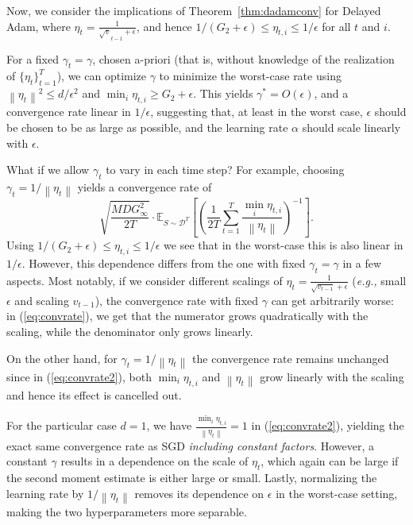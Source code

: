 \documentclass{article}
\newcommand{\eg}{\textit{e.g.,} }
\newcommand{\norm}[1]{\left\lVert{#1}\right\rVert}
\newcommand{\thmref}[1]{Theorem~\ref{#1}}
\renewcommand{\eqref}[1]{(\ref{#1})}
\newcommand{\prevv}{v_{t-1}}
\newcommand{\curre}{\eta_t}
\newcommand{\currei}{\eta_{t,i}}
\newcommand{\fdist}{D}
\newcommand{\smooth}{M}
\newcommand{\gradb}{G_\infty}
\newcommand{\gradbtwo}{G_2}
\newcommand{\expec}[2]{\mathbb E_{#1} \left[ {#2} \right]}
\newcommand{\dist}{\mathcal D}
\begin{document}
Now, we consider the implications of \thmref{thm:dadamconv} for Delayed Adam,
where $\curre = \frac{1}{\sqrt \prevv + \epsilon}$, and hence
$1 / (\gradbtwo + \epsilon) \leq \currei \leq 1 / \epsilon$
for all $t$ and $i$.

For a fixed $\gamma_t = \gamma$, chosen a-priori (that is, without knowledge of
the realization of $\{\curre\}_{t=1}^T$), we can optimize $\gamma$ to minimize
the worst-case rate using $\norm{\curre}^2 \leq d/\epsilon^2$ and
$\min_i \currei \geq \gradbtwo + \epsilon$.  This yields
$\gamma^* = O(\epsilon)$, and a convergence rate linear in $1 / \epsilon$,
suggesting that, at least in the worst case, $\epsilon$ should be chosen to be
as large as possible, and the learning rate $\alpha$ should scale linearly with
$\epsilon$.

What if we allow $\gamma_t$ to vary in each time step?  For example, choosing
$\gamma_t = 1 / \norm{\curre}$ yields a convergence rate of
\begin{equation}
  \sqrt{\frac{\smooth \fdist \gradb^2}{2T}} \cdot
            \expec{S \sim \dist^T}{\left(\frac{1}{2T} \sum_{t=1}^T \frac{\min_i \currei}{\norm{\curre}}\right)^{-1}}.
\label{eq:convrate2}
\end{equation}
Using $1 / (\gradbtwo + \epsilon) \leq \currei \leq 1 / \epsilon$ we see
that in the worst-case this is also linear in $1/ \epsilon$. However, this dependence differs
from the one with fixed $\gamma_t = \gamma$ in a few aspects.  Most notably, if
we consider different scalings of $\curre = \frac{1}{\sqrt {\prevv} + \epsilon}$
(\eg small $\epsilon$ and scaling $\prevv$), the convergence rate with fixed
$\gamma$ can get arbitrarily worse: in \eqref{eq:convrate}, we get that the numerator grows quadratically with the scaling, while the denominator only grows linearly.

On the other hand, for
$\gamma_t = 1 / \norm{\curre}$ the convergence rate remains unchanged since in \eqref{eq:convrate2}, both $\min_i \currei$ and $\norm{\curre}$ grow linearly with the scaling and hence its effect is cancelled out.

For the particular case $d=1$, we have
$\frac{\min_i \currei}{\norm{\curre}} = 1$ in \eqref{eq:convrate2}, yielding the exact same convergence rate as SGD \emph{including constant factors}. However, a constant
$\gamma$ results in a dependence on the scale of $\curre$, which
again can be large if the second moment estimate is either large or small.  Lastly, normalizing
the learning rate by $1 / \norm{\curre}$ removes its dependence on
$\epsilon$ in the worst-case setting, making the two hyperparameters
more separable.
\end{document}
